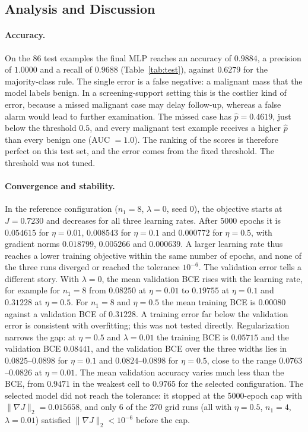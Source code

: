 \clearpage %

\subsection{Analysis and Discussion}
\label{sec:analysis}

\paragraph{Accuracy.}
On the 86 test examples the final MLP reaches an accuracy of $0.9884$, a precision of $1.0000$ and a recall of $0.9688$ (Table~\ref{tab:test}), against $0.6279$ for the majority-class rule. The single error is a false negative: a malignant mass that the model labels benign. In a screening-support setting this is the costlier kind of error, because a missed malignant case may delay follow-up, whereas a false alarm would lead to further examination. The missed case has $\hat p=0.4619$, just below the threshold $0.5$, and every malignant test example receives a higher $\hat p$ than every benign one (AUC $=1.0$). The ranking of the scores is therefore perfect on this test set, and the error comes from the fixed threshold. The threshold was not tuned.

\paragraph{Convergence and stability.}
In the reference configuration ($n_1=8$, $\lambda=0$, seed 0), the objective starts at $J=0.7230$ and decreases for all three learning rates. After 5000 epochs it is $0.054615$ for $\eta=0.01$, $0.008543$ for $\eta=0.1$ and $0.000772$ for $\eta=0.5$, with gradient norms $0.018799$, $0.005266$ and $0.000639$. A larger learning rate thus reaches a lower training objective within the same number of epochs, and none of the three runs diverged or reached the tolerance $10^{-6}$. The validation error tells a different story. With $\lambda=0$, the mean validation BCE rises with the learning rate, for example for $n_1=8$ from $0.08250$ at $\eta=0.01$ to $0.19755$ at $\eta=0.1$ and $0.31228$ at $\eta=0.5$. For $n_1=8$ and $\eta=0.5$ the mean training BCE is $0.00080$ against a validation BCE of $0.31228$. A training error far below the validation error is consistent with overfitting; this was not tested directly. Regularization narrows the gap: at $\eta=0.5$ and $\lambda=0.01$ the training BCE is $0.05715$ and the validation BCE $0.08441$, and the validation BCE over the three widths lies in $0.0825$--$0.0898$ for $\eta=0.1$ and $0.0824$--$0.0898$ for $\eta=0.5$, close to the range $0.0763$--$0.0826$ at $\eta=0.01$. The mean validation accuracy varies much less than the BCE, from $0.9471$ in the weakest cell to $0.9765$ for the selected configuration. The selected model did not reach the tolerance: it stopped at the 5000-epoch cap with $\lVert\nabla J\rVert_2=0.015658$, and only 6 of the 270 grid runs (all with $\eta=0.5$, $n_1=4$, $\lambda=0.01$) satisfied $\lVert\nabla J\rVert_2<10^{-6}$ before the cap.

